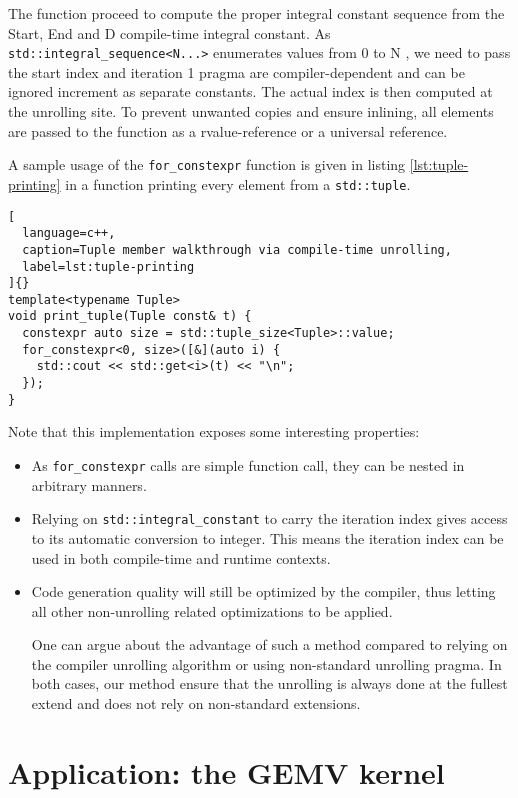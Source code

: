 \documentclass[../main]{subfiles}
\begin{document}
The function proceed to compute the proper
integral constant sequence from the Start,
End and D compile-time integral constant. As
\lstinline{std::integral_sequence<N...>} enumerates values
from 0 to N , we need to pass the start index and iteration
1 pragma are compiler-dependent and can be ignored
increment as separate constants. The actual index is then
computed at the unrolling site. To prevent unwanted copies
and ensure inlining, all elements are passed to the function
as a rvalue-reference or a universal reference.

A sample usage of the \lstinline{for_constexpr} function is given
in listing \ref{lst:tuple-printing} in a function printing
every element from a \lstinline{std::tuple}.

\begin{lstlisting}[
  language=c++,
  caption=Tuple member walkthrough via compile-time unrolling,
  label=lst:tuple-printing
]{}
template<typename Tuple>
void print_tuple(Tuple const& t) {
  constexpr auto size = std::tuple_size<Tuple>::value;
  for_constexpr<0, size>([&](auto i) {
    std::cout << std::get<i>(t) << "\n";
  });
}
\end{lstlisting}

Note that this implementation exposes some interesting
properties:

\begin{itemize}
\item
As \lstinline{for_constexpr} calls are simple function call, they
can be nested in arbitrary manners.

\item
Relying on \lstinline{std::integral_constant} to carry the
iteration index gives access to its automatic conversion
to integer. This means the iteration index can be used in
both compile-time and runtime contexts.

\item
Code generation quality will still be optimized by the
compiler, thus letting all other non-unrolling related optimizations
to be applied.

One can argue about the advantage of such a method
compared to relying on the compiler unrolling algorithm
or using non-standard unrolling pragma. In both cases, our
method ensure that the unrolling is always done at the fullest
extend and does not rely on non-standard extensions.
\end{itemize}

\section{
  Application: the GEMV kernel
}
\end{document}
